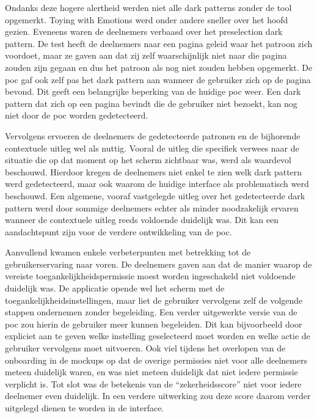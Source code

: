 \vspace{1em}

Ondanks deze hogere alertheid werden niet alle dark patterns zonder de tool opgemerkt. Toying with Emotions werd onder andere sneller over het hoofd gezien. Eveneens waren de deelnemers verbaasd over het preselection dark pattern. De test heeft de deelnemers naar een pagina geleid waar het patroon zich voordoet, maar ze gaven aan dat zij zelf waarschijnlijk niet naar die pagina zouden zijn gegaan en dus het patroon als nog niet zouden hebben opgemerkt. De \acrshort{poc} gaf ook zelf pas het dark pattern aan wanneer de gebruiker zich op de pagina bevond. Dit geeft een belangrijke beperking van de huidige \acrlong{poc} weer. Een dark pattern dat zich op een pagina bevindt die de gebruiker niet bezoekt, kan nog niet door de \acrshort{poc} worden gedetecteerd.

\vspace{1em}

Vervolgens ervoeren de deelnemers de gedetecteerde patronen en de bijhorende contextuele uitleg wel als nuttig. Vooral de uitleg die specifiek verwees naar de situatie die op dat moment op het scherm zichtbaar was, werd als waardevol beschouwd. Hierdoor kregen de deelnemers niet enkel te zien welk dark pattern werd gedetecteerd, maar ook waarom de huidige interface als problematisch werd beschouwd. Een algemene, vooraf vastgelegde uitleg over het gedetecteerde dark pattern werd door sommige deelnemers echter als minder noodzakelijk ervaren wanneer de contextuele uitleg reeds voldoende duidelijk was. Dit kan een aandachtspunt zijn voor de verdere ontwikkeling van de \acrshort{poc}.

\vspace{1em}

Aanvullend kwamen enkele verbeterpunten met betrekking tot de gebruikerservaring naar voren. De deelnemers gaven aan dat de manier waarop de vereiste toegankelijkheidspermissie moest worden ingeschakeld niet voldoende duidelijk was. De applicatie opende wel het scherm met de toegankelijkheidsinstellingen, maar liet de gebruiker vervolgens zelf de volgende stappen ondernemen zonder begeleiding. Een verder uitgewerkte versie van de \acrshort{poc} zou hierin de gebruiker meer kunnen begeleiden. Dit kan bijvoorbeeld door expliciet aan te geven welke instelling geselecteerd moet worden en welke actie de gebruiker vervolgens moet uitvoeren. Ook viel tijdens het overlopen van de onboarding in de mockups op dat de overige permissies niet voor alle deelnemers meteen duidelijk waren, en was niet meteen duidelijk dat niet iedere permissie verplicht is. Tot slot was de betekenis van de ``zekerheidsscore'' niet voor iedere deelnemer even duidelijk. In een verdere uitwerking zou deze score daarom verder uitgelegd dienen te worden in de interface.

